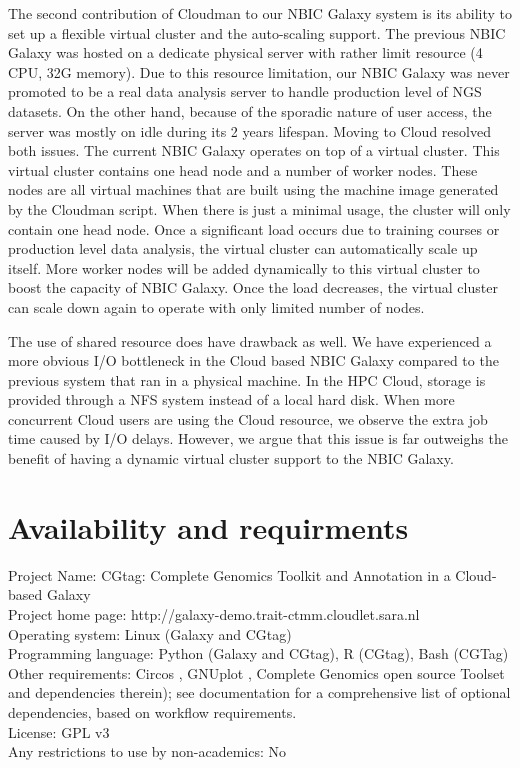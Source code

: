\documentclass[10pt]{bmc_article}
\newenvironment{bmcformat}{\begin{raggedright}\baselineskip20pt\sloppy\setboolean{publ}{false}}{\end{raggedright}\baselineskip20pt\sloppy}
\begin{document}
\begin{bmcformat}
The second contribution of Cloudman to our NBIC Galaxy system is its ability to set up a flexible virtual cluster and the auto-scaling support. The previous NBIC Galaxy was hosted on a dedicate physical server with rather limit resource (4 CPU, 32G memory). Due to this resource limitation, our NBIC Galaxy was never promoted to be a real data analysis server to handle production level of NGS datasets. On the other hand, because of the sporadic nature of user access, the server was mostly on idle during its 2 years lifespan. Moving to Cloud resolved both issues. The current NBIC Galaxy operates on top of a virtual cluster. This virtual cluster contains one head node and a number of worker nodes. These nodes are all virtual machines that are built using the machine image generated by the Cloudman script. When there is just a minimal usage, the cluster will only contain one head node. Once a significant load occurs due to training courses or production level data analysis, the virtual cluster can automatically scale up itself. More worker nodes will be added dynamically to this virtual cluster to boost the capacity of NBIC Galaxy. Once the load decreases, the virtual cluster can scale down again to operate with only limited number of nodes.

The use of shared resource does have drawback as well. We have experienced a more obvious I/O bottleneck in the Cloud based NBIC Galaxy compared to the previous system that ran in a physical machine. In the HPC Cloud, storage is provided through a NFS system instead of a local hard disk. When more concurrent Cloud users are using the Cloud resource, we observe the extra job time caused by I/O delays. However, we argue that this issue is far outweighs the benefit of having a dynamic virtual cluster support to the NBIC Galaxy.
    
\section*{Availability and requirments}
Project Name: CGtag: Complete Genomics Toolkit and Annotation in a Cloud-based Galaxy\\
Project home page: http://galaxy-demo.trait-ctmm.cloudlet.sara.nl\\
Operating system: Linux (Galaxy and CGtag)\\
Programming language: Python (Galaxy and CGtag), R (CGtag), Bash (CGTag) \\
Other requirements: Circos \cite{url-circos}, GNUplot \cite{url-gnuplot}, Complete Genomics open source Toolset \cite{url-cgatools}  and dependencies therein);  see documentation for a comprehensive list of optional dependencies, based on workflow requirements.\\
License: GPL v3\\
Any restrictions to use by non-academics: No\\



\end{bmcformat}
\end{document}
